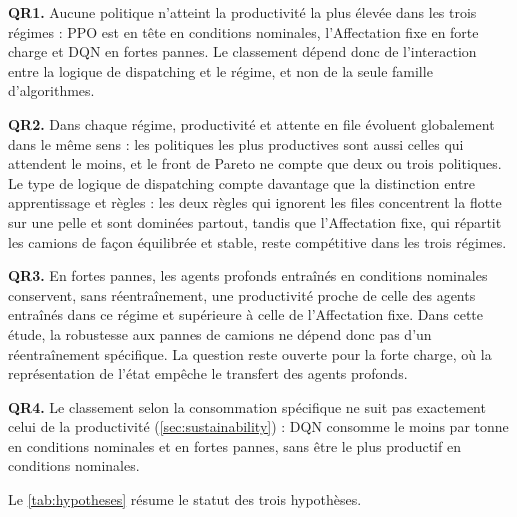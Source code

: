 \documentclass[11pt,a4paper]{article}
\newif\ifrevmarks
\newcommand{\revtag}[1]{\ifrevmarks\textsuperscript{\textcolor{red!70!black}{\scriptsize[#1]}}\fi}
\newenvironment{revbloc}[1]{\par\ifrevmarks\color{revcolor}\noindent\revtag{#1}\ \fi}{\par}
\begin{document}
\begin{revbloc}{M18, M23}
\textbf{QR1.} Aucune politique n'atteint la productivité la plus élevée dans les trois régimes : PPO est en tête en conditions nominales, l'Affectation fixe en forte charge et DQN en fortes pannes. Le classement dépend donc de l'interaction entre la logique de dispatching et le régime, et non de la seule famille d'algorithmes.

\textbf{QR2.} Dans chaque régime, productivité et attente en file évoluent globalement dans le même sens : les politiques les plus productives sont aussi celles qui attendent le moins, et le front de Pareto ne compte que deux ou trois politiques. Le type de logique de dispatching compte davantage que la distinction entre apprentissage et règles : les deux règles qui ignorent les files concentrent la flotte sur une pelle et sont dominées partout, tandis que l'Affectation fixe, qui répartit les camions de façon équilibrée et stable, reste compétitive dans les trois régimes.

\textbf{QR3.} En fortes pannes, les agents profonds entraînés en conditions nominales conservent, sans réentraînement, une productivité proche de celle des agents entraînés dans ce régime et supérieure à celle de l'Affectation fixe. Dans cette étude, la robustesse aux pannes de camions ne dépend donc pas d'un réentraînement spécifique. La question reste ouverte pour la forte charge, où la représentation de l'état empêche le transfert des agents profonds.

\textbf{QR4.} Le classement selon la consommation spécifique ne suit pas exactement celui de la productivité (\cref{sec:sustainability}) : DQN consomme le moins par tonne en conditions nominales et en fortes pannes, sans être le plus productif en conditions nominales.
\end{revbloc}

Le \cref{tab:hypotheses} résume le statut des trois hypothèses.
\end{document}
